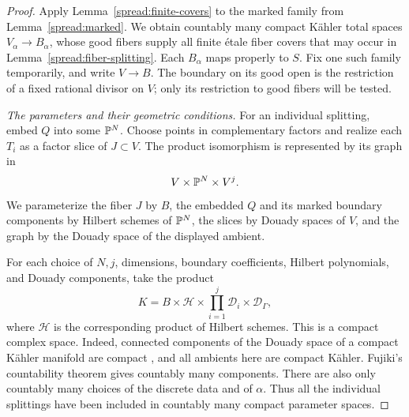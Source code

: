 \begin{proof}
Apply Lemma~\ref{spread:finite-covers} to the marked family from
Lemma~\ref{spread:marked}.  We obtain countably many compact K\"ahler
total spaces \(V_\alpha\to B_\alpha\), whose good fibers supply all
finite \'etale fiber covers that may occur in
Lemma~\ref{spread:fiber-splitting}.  Each \(B_\alpha\) maps properly
to \(S\).  Fix one such family temporarily, and write \(V\to B\).
The boundary on its good open is the restriction of a fixed rational
divisor on \(V\); only its restriction to good fibers will be tested.

\smallskip
\noindent\emph{The parameters and their geometric conditions.}
For an individual splitting, embed \(Q\) into some \(\mathbb P^N\).
Choose points in complementary factors and realize each \(T_i\)
as a factor slice of \(J\subset V\).  The product isomorphism is
represented by its graph in
\[
 V\times\mathbb P^N\times V^j.
\]
We parameterize the fiber \(J\) by \(B\), the embedded \(Q\) and its
marked boundary components by Hilbert schemes of \(\mathbb P^N\), the
slices by Douady spaces of \(V\), and the graph by the Douady space
of the displayed ambient.

For each choice of \(N,j\), dimensions, boundary coefficients,
Hilbert polynomials, and Douady components, take the product
\[
 K=B\times\mathscr H\times
       \prod_{i=1}^j\mathscr D_i\times\mathscr D_\Gamma,
\]
where \(\mathscr H\) is the corresponding product of Hilbert schemes.
This is a compact complex space.  Indeed, connected components of
the Douady space of a compact K\"ahler manifold are compact
\cite[Corollary~5.3]{Toma11}, and all ambients here are compact
K\"ahler.  Fujiki's countability theorem \cite{Fujiki79} gives
countably many components.  There are also only countably many
choices of the discrete data and of \(\alpha\).  Thus all the
individual splittings have been included in countably many compact
parameter spaces.


\end{proof}
